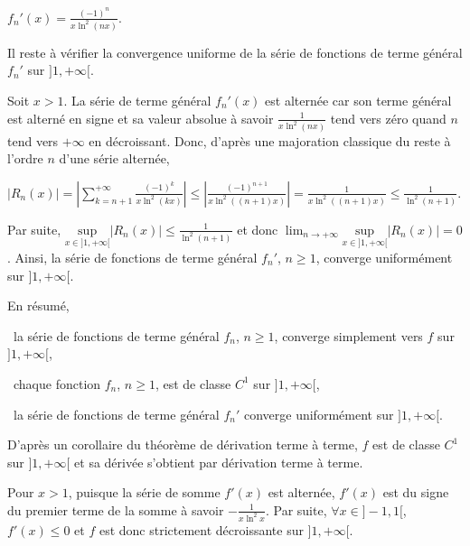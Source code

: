 {\begin{enumerate}
{\begin{center}
$f_n'(x) =\frac{(-1)^n}{x\ln^2(nx)}$.
\end{center}

Il reste à vérifier la convergence uniforme de la série de fonctions de terme général $f_n'$ sur $]1,+\infty[$.

Soit $x > 1$. La série de terme général $f_n'(x)$ est alternée car son terme général est alterné en signe et sa valeur absolue à savoir $\frac{1}{x\ln^2(nx)}$ tend vers zéro quand $n$ tend vers $+\infty$ en décroissant. Donc, d'après une majoration classique du reste à l'ordre $n$ d'une série alternée,

\begin{center}
$|R_n(x)|=\left|\sum_{k=n+1}^{+\infty}\frac{(-1)^k}{x\ln^2(kx)}\right|\leqslant\left|\frac{(-1)^{n+1}}{x\ln^2((n+1)x)}\right|=\frac{1}{x\ln^2((n+1)x)}\leqslant\frac{1}{\ln^2(n+1)}$.
\end{center}

Par suite, $\underset{x\in]1,+\infty[}{\text{sup}}|R_n(x)|\leqslant\frac{1}{\ln^2(n+1)}$ et donc $\lim_{n \rightarrow +\infty}\underset{x\in]1,+\infty[}{\text{sup}}|R_n(x)|=0$. Ainsi, la série de fonctions de terme général $f_n'$, $n\geqslant1$, converge uniformément sur $]1,+\infty[$.

En résumé,

\textbullet~la série de fonctions de terme général $f_n$, $n\geqslant1$, converge simplement vers $f$ sur $]1,+\infty[$,

\textbullet~chaque fonction $f_n$, $n\geqslant1$, est de classe $C^1$ sur $]1,+\infty[$,

\textbullet~la série de fonctions de terme général $f_n'$ converge uniformément sur $]1,+\infty[$.

D'après un corollaire du théorème de dérivation terme à terme, $f$ est de classe $C^1$ sur $]1,+\infty[$ et sa dérivée s'obtient par dérivation terme à terme. 

\begin{center}
\shadowbox{
$f$ est de classe $C^1$ sur $]1,+\infty[$ et $\forall x>1$, $f'(x) =\sum_{n=1}^{+\infty}\frac{(-1)^n}{x\ln^2(nx)}$.
}
\end{center}

Pour $x >1$, puisque la série de somme $f'(x)$ est alternée, $f'(x)$ est du signe du premier terme de la somme à savoir $-\frac{1}{x\ln^2x}$. Par suite, $\forall x\in]-1,1[$, $f'(x)\leqslant0$ et $f$ est donc strictement décroissante sur $]1,+\infty[$.

\begin{center}
\shadowbox{
La fonction $f$ est décroissante sur $]1,+\infty[$.
}
\end{center}}
\end{enumerate}
}